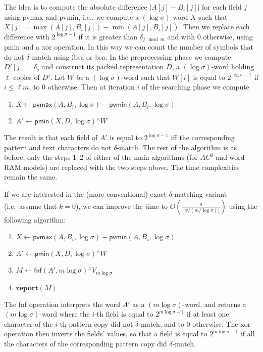 \documentclass{llncs}
\newcommand{\floor}[1]{\lfloor #1 \rfloor}
\def \bxor{\textsf{xor}\xspace}
\newcommand{\uxor}{\mathrel{^\wedge}}
\newcommand{\word}[1]{#1}
\newcommand{\fword}[1]{$(#1)$-word}
\begin{document}
The idea is to compute the absolute difference $|A[j] - B_i[j]|$ for
each field $j$ using \textsf{pvmax} and \textsf{pvmin},
i.e., we compute a \fword{\log\sigma} $X$ such that $X[j]=\max(A[j], B_i[j]) - \min(A[j], B_i[j])$. Then we
replace each difference with $2^{\log\sigma -1}$ if it is greater than
$\delta_{j\mod m}$ and with $0$ otherwise, using \textsf{pmin} and a
\bxor operation. In this way we can count the number of symbols that do not $\delta$-match using \textsf{ibsa} or \textsf{bsa}.
In the preprocessing phase we compute $D'[j] = \delta_j$ and construct
its packed representation $\word{D}$, a \fword{\log\sigma} holding $\ell$ copies of $D'$.
Let $\word{W}$ be a \fword{\log\sigma} such that $W[i]$ is equal to
$2^{\log\sigma-1}$ if $i\le \ell m$, to $0$ otherwise.
Then at iteration $i$ of the searching phase we compute
\begin{enumerate}
\item $\word{X} \leftarrow
\textsf{pvmax}(\word{A},\word{B_i},\log\sigma) -
\textsf{pvmin}(\word{A},\word{B_i},\log\sigma)$
\item $\word{A'} \leftarrow \textsf{pmin}(\word{X}, \word{D},\log\sigma) \uxor \word{W}$
\end{enumerate}
The result is that each field of $\word{A'}$ is equal to $2^{\log\sigma-1}$ iff the corresponding
pattern and text characters do not $\delta$-match.
The rest of the algorithm is as before, only the steps 1--2 of either
of the main algorithms (for $AC^0$ and word-RAM models) are replaced
with the two steps above. The time complexities remain the same.

If we are interested in the (more conventional) exact $\delta$-matching variant
(i.e.\ assume that $k=0$), we can improve
the time to $O(\frac{n}{\floor{w/(m/\log\sigma)}})$ using the following algorithm:
\begin{enumerate}
\item $\word{X} \leftarrow
\textsf{pvmax}(\word{A},\word{B_i},\log\sigma) -
\textsf{pvmin}(\word{A},\word{B_i},\log\sigma)$
\item $\word{A'} \leftarrow \textsf{pmin}(\word{X}, \word{D},\log\sigma) \uxor \word{W}$
\item $M\leftarrow \textsf{fnf}(\word{A'}, m\log\sigma) \uxor \word{V_{m\log\sigma}}$
\item $\textbf{report}(M)$
\end{enumerate}

The \textsf{fnf} operation interprets the word $\word{A'}$ as a
\fword{m\log\sigma}, and returns a \fword{m\log\sigma} where
the $i$-th field is equal to $2^{m\log\sigma-1}$ if at least one character of
the $i$-th pattern copy did not $\delta$-match, and to $0$ otherwise.
The \bxor operation then inverts the fields' values, so that a field is
equal to $2^{m\log\sigma-1}$ if all the characters of the
corresponding pattern copy did $\delta$-match.
\end{document}

